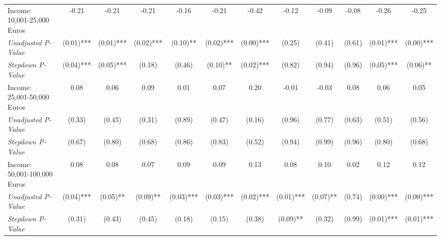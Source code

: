 \begin{tabular}{l c c c c c c c c c c c}
Income: 10,001-25,000 Euros & -0.21 & -0.21 & -0.21 & -0.16 & -0.21 & -0.42 & -0.12 & -0.09 & -0.08 & -0.26 & -0.25 \\
\quad \textit{Unadjusted P-Value} & (0.01)*** & (0.01)*** & (0.02)*** & (0.10)** & (0.02)*** & (0.00)*** & (0.25) & (0.41) & (0.61) & (0.01)*** & (0.00)*** \\
\quad \textit{Stepdown P-Value} & (0.04)*** & (0.05)*** & (0.18) & (0.46) & (0.10)** & (0.02)*** & (0.82) & (0.94) & (0.96) & (0.05)*** & (0.06)** \\
Income: 25,001-50,000 Euros & 0.08 & 0.06 & 0.09 & 0.01 & 0.07 & 0.20 & -0.01 & -0.03 & 0.08 & 0.06 & 0.05 \\
\quad \textit{Unadjusted P-Value} & (0.33) & (0.45) & (0.31) & (0.89) & (0.47) & (0.16) & (0.96) & (0.77) & (0.63) & (0.51) & (0.56) \\
\quad \textit{Stepdown P-Value} & (0.67) & (0.80) & (0.68) & (0.86) & (0.83) & (0.52) & (0.94) & (0.99) & (0.96) & (0.80) & (0.68) \\
Income: 50,001-100,000 Euros & 0.08 & 0.08 & 0.07 & 0.09 & 0.09 & 0.13 & 0.08 & 0.10 & 0.02 & 0.12 & 0.12 \\
\quad \textit{Unadjusted P-Value} & (0.04)*** & (0.05)** & (0.09)** & (0.03)*** & (0.03)*** & (0.02)*** & (0.01)*** & (0.07)** & (0.74) & (0.00)*** & (0.00)*** \\
\quad \textit{Stepdown P-Value} & (0.31) & (0.43) & (0.45) & (0.18) & (0.15) & (0.38) & (0.09)** & (0.32) & (0.99) & (0.01)*** & (0.01)*** \\
\bottomrule
\end{tabular}
